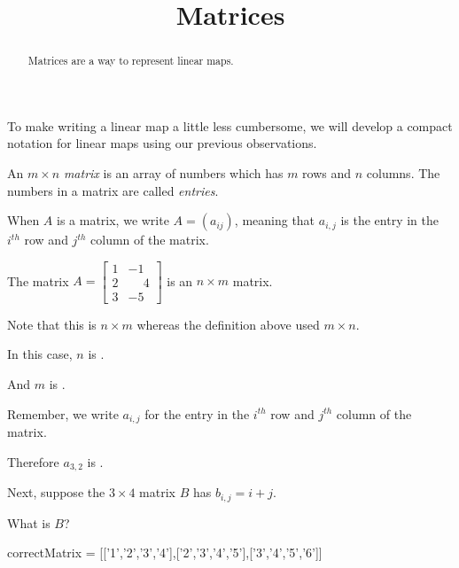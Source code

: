 \documentclass{ximera}
\title{Matrices}
\begin{document}
\begin{abstract}
  Matrices are a way to represent linear maps.
\end{abstract}

To make writing a linear map a little less cumbersome, we will develop a compact notation for linear maps using our previous observations.
	
\begin{definition}
  An $m \times n$ \textit{matrix} is an array of numbers which has $m$ rows and $n$ columns.  The numbers in a matrix are called \textit{entries}.

  When $A$ is a matrix, we write $A = (a_{ij})$, meaning that $a_{i,j}$ is the entry in the $i^{th}$  row and $j^{th}$ column of the matrix.
\end{definition}

\begin{question}
  The matrix $A = \begin{bmatrix}
    1&-1\\2&\phantom{-}4\\3&-5
  \end{bmatrix}$
  is an $n \times m$ matrix.  

  \begin{solution}
    \begin{hint}
      Note that this is $n \times m$ whereas the definition above used $m \times n$.
    \end{hint}

    In this case, $n$ is .
  \end{solution}

  \begin{solution}
    And $m$ is .
  \end{solution}

  Remember, we write $a_{i,j}$ for the entry in the $i^{th}$ row and $j^{th}$ column of the matrix.

  \begin{solution}
    Therefore $a_{3,2}$ is .
  \end{solution}

  Next, suppose the $3 \times 4$ matrix $B$ has $b_{i,j} = i+j$.

  \begin{solution}
    What is $B$?

    \begin{matrix-answer}[name=B]
      correctMatrix = [['1','2','3','4'],['2','3','4','5'],['3','4','5','6']]
    \end{matrix-answer}
  \end{solution}
\end{question}
\end{document}

